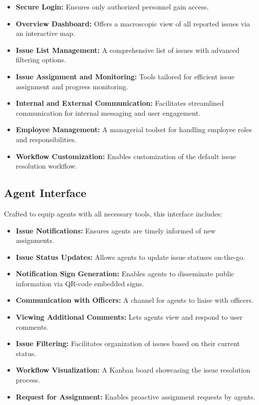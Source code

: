     \begin{itemize}
        \item \textbf{Secure Login:} Ensures only authorized personnel gain access.
        \item \textbf{Overview Dashboard:} Offers a macroscopic view of all reported issues via an interactive map.
        \item \textbf{Issue List Management:} A comprehensive list of issues with advanced filtering options.
        \item \textbf{Issue Assignment and Monitoring:} Tools tailored for efficient issue assignment and progress monitoring.
        \item \textbf{Internal and External Communication:} Facilitates streamlined communication for internal messaging and user engagement.
        \item \textbf{Employee Management:} A managerial toolset for handling employee roles and responsibilities.
        \item \textbf{Workflow Customization:} Enables customization of the default issue resolution workflow.
    \end{itemize}

\subsection{Agent Interface}
    Crafted to equip agents with all necessary tools, this interface includes:
    
    \begin{itemize}
        \item \textbf{Issue Notifications:} Ensures agents are timely informed of new assignments.
        \item \textbf{Issue Status Updates:} Allows agents to update issue statuses on-the-go.
        \item \textbf{Notification Sign Generation:} Enables agents to disseminate public information via QR-code embedded signs.
        \item \textbf{Communication with Officers:} A channel for agents to liaise with officers.
        \item \textbf{Viewing Additional Comments:} Lets agents view and respond to user comments.
        \item \textbf{Issue Filtering:} Facilitates organization of issues based on their current status.
        \item \textbf{Workflow Visualization:} A \gls{Kanban board} showcasing the issue resolution process.
        \item \textbf{Request for Assignment:} Enables proactive assignment requests by agents.
    \end{itemize}

